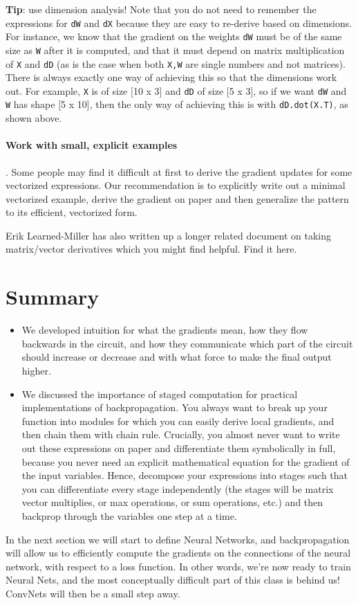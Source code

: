 \textbf{Tip}: use dimension analysis! Note that you do not need to remember the expressions for \texttt{dW} and \texttt{dX} because they are easy to re-derive based on dimensions. For instance, we know that the gradient on the weights \texttt{dW} must be of the same size as \texttt{W} after it is computed, and that it must depend on matrix multiplication of \texttt{X} and \texttt{dD} (as is the case when both \texttt{X,W} are single numbers and not matrices). There is always exactly one way of achieving this so that the dimensions work out. For example, \texttt{X} is of size [10 x 3] and \texttt{dD} of size [5 x 3], so if we want \texttt{dW} and \texttt{W} has shape [5 x 10], then the only way of achieving this is with \texttt{dD.dot(X.T)}, as shown above.

\paragraph*{Work with small, explicit examples}. Some people may find it difficult at first to derive the gradient updates for some vectorized expressions. Our recommendation is to explicitly write out a minimal vectorized example, derive the gradient on paper and then generalize the pattern to its efficient, vectorized form.

Erik Learned-Miller has also written up a longer related document on taking matrix/vector derivatives which you might find helpful. Find it here.


\section*{Summary}
\begin{itemize}
\item We developed intuition for what the gradients mean, how they flow backwards in the circuit, and how they communicate which part of the circuit should increase or decrease and with what force to make the final output higher.
\item We discussed the importance of staged computation for practical implementations of backpropagation. You always want to break up your function into modules for which you can easily derive local gradients, and then chain them with chain rule. Crucially, you almost never want to write out these expressions on paper and differentiate them symbolically in full, because you never need an explicit mathematical equation for the gradient of the input variables. Hence, decompose your expressions into stages such that you can differentiate every stage independently (the stages will be matrix vector multiplies, or max operations, or sum operations, etc.) and then backprop through the variables one step at a time.
\end{itemize}

In the next section we will start to define Neural Networks, and backpropagation will allow us to efficiently compute the gradients on the connections of the neural network, with respect to a loss function. In other words, we’re now ready to train Neural Nets, and the most conceptually difficult part of this class is behind us! ConvNets will then be a small step away.